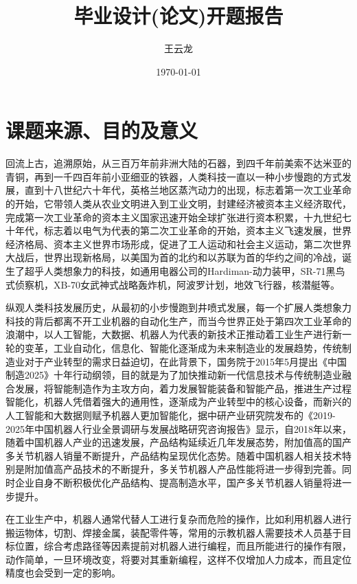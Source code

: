 \documentclass{article}
\title{\songti\zihao{3}毕业设计(论文)开题报告}
\author{王云龙}
\date{\today}
\begin{document}
\maketitle
\fancypage{\fbox}{}
\section{课题来源、目的及意义}
回流上古，追溯原始，从三百万年前非洲大陆的石器，到四千年前美索不达米亚的青铜，再到一千四百年前小亚细亚的铁器，人类科技一直以一种小步慢跑的方式发展，直到十八世纪六十年代，英格兰地区蒸汽动力的出现，标志着第一次工业革命的开始，它带领人类从农业文明进入到工业文明，封建经济被资本主义经济取代，完成第一次工业革命的资本主义国家迅速开始全球扩张进行资本积累，十九世纪七十年代，标志着以电气为代表的第二次工业革命的开始，资本主义飞速发展，世界经济格局、资本主义世界市场形成，促进了工人运动和社会主义运动，第二次世界大战后，世界出现新格局，以美国为首的北约和以苏联为首的华约之间的冷战，诞生了超乎人类想象力的科技，如通用电器公司的Hardiman-动力装甲，SR-71黑鸟式侦察机，XB-70女武神式战略轰炸机，阿波罗计划，地效飞行器，核潜艇等。

纵观人类科技发展历史，从最初的小步慢跑到井喷式发展，每一个扩展人类想象力科技的背后都离不开工业机器的自动化生产，而当今世界正处于第四次工业革命的浪潮中，以人工智能，大数据、机器人为代表的新技术正推动着工业生产进行新一轮的变革，工业自动化，信息化、智能化逐渐成为未来制造业的发展趋势，传统制造业对于产业转型的需求日益迫切，在此背景下，国务院于2015年5月提出《中国制造2025》十年行动纲领，目的就是为了加快推动新一代信息技术与传统制造业融合发展，将智能制造作为主攻方向，着力发展智能装备和智能产品，推进生产过程智能化，机器人凭借着强大的通用性，逐渐成为产业转型中的核心设备，而新兴的人工智能和大数据则赋予机器人更加智能化，据中研产业研究院发布的《2019-2025年中国机器人行业全景调研与发展战略研究咨询报告》显示，自2018年以来，随着中国机器人产业的迅速发展，产品结构延续近几年发展态势，附加值高的国产多关节机器人销量不断提升，产品结构呈现优化态势。随着中国机器人相关技术特别是附加值高产品技术的不断提升，多关节机器人产品性能将进一步得到完善。同时企业自身不断积极优化产品结构、提高制造水平，国产多关节机器人销量将进一步提升。

在工业生产中，机器人通常代替人工进行复杂而危险的操作，比如利用机器人进行搬运物体，切割、焊接金属，装配零件等，常用的示教机器人需要技术人员基于目标位置，综合考虑路径等因素提前对机器人进行编程，而且所能进行的操作有限，动作简单，一旦环境改变，将要对其重新编程，这样不仅增加人力成本，而且定位精度也会受到一定的影响。
\end{document}
